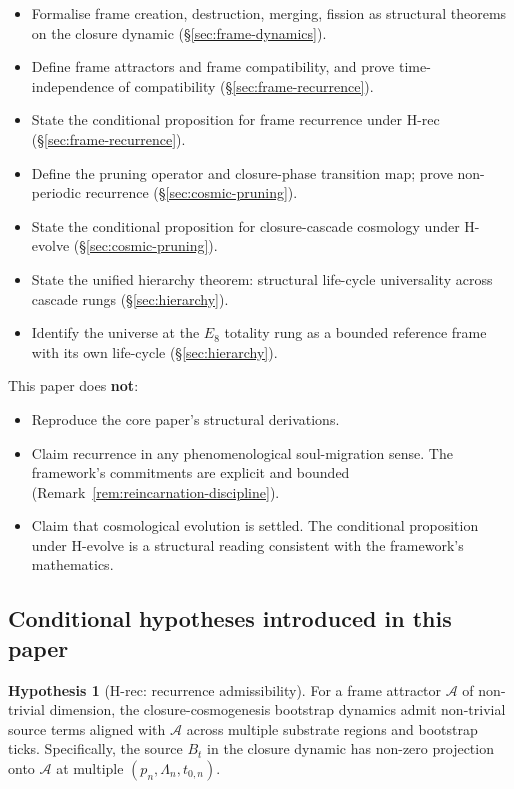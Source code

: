 \documentclass[11pt]{article}
\theoremstyle{plain}
\theoremstyle{definition}
\newtheorem{hypothesis}[theorem]{Hypothesis}
\theoremstyle{remark}
\begin{document}
\begin{itemize}[leftmargin=2em]
\item Formalise frame creation, destruction, merging, fission as structural theorems on the closure dynamic (\S\ref{sec:frame-dynamics}).
\item Define frame attractors and frame compatibility, and prove time-independence of compatibility (\S\ref{sec:frame-recurrence}).
\item State the conditional proposition for frame recurrence under H-rec (\S\ref{sec:frame-recurrence}).
\item Define the pruning operator and closure-phase transition map; prove non-periodic recurrence (\S\ref{sec:cosmic-pruning}).
\item State the conditional proposition for closure-cascade cosmology under H-evolve (\S\ref{sec:cosmic-pruning}).
\item State the unified hierarchy theorem: structural life-cycle universality across cascade rungs (\S\ref{sec:hierarchy}).
\item Identify the universe at the $E_8$ totality rung as a bounded reference frame with its own life-cycle (\S\ref{sec:hierarchy}).
\end{itemize}

This paper does \textbf{not}:

\begin{itemize}[leftmargin=2em]
\item Reproduce the core paper's structural derivations.
\item Claim recurrence in any phenomenological soul-migration sense. The framework's commitments are explicit and bounded (Remark~\ref{rem:reincarnation-discipline}).
\item Claim that cosmological evolution is settled. The conditional proposition under H-evolve is a structural reading consistent with the framework's mathematics.
\end{itemize}

\subsection{Conditional hypotheses introduced in this paper}

\begin{hypothesis}[H-rec: recurrence admissibility]\label{hyp:h-rec}
For a frame attractor $\mathcal{A}$ of non-trivial dimension, the closure-cosmogenesis bootstrap dynamics admit non-trivial source terms aligned with $\mathcal{A}$ across multiple substrate regions and bootstrap ticks. Specifically, the source $B_t$ in the closure dynamic has non-zero projection onto $\mathcal{A}$ at multiple $(p_n, \Lambda_n, t_{0,n})$.
\end{hypothesis}
\end{document}
